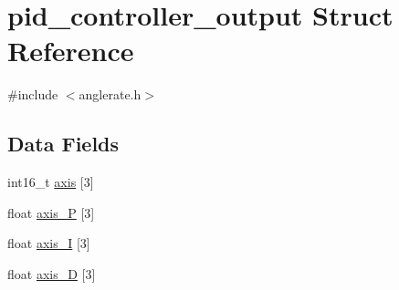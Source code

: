 \hypertarget{structpid__controller__output}{\section{pid\+\_\+controller\+\_\+output Struct Reference}
\label{structpid__controller__output}
}


{\ttfamily \#include $<$anglerate.\+h$>$}

\subsection*{Data Fields}
\begin{DoxyCompactItemize}
\item 
int16\+\_\+t \hyperlink{structpid__controller__output_a88edf80b3efde787747b459dde00e418}{axis} \mbox{[}3\mbox{]}
\item 
float \hyperlink{structpid__controller__output_a18a80534b5688a9ece1e96116b66c631}{axis\+\_\+\+P} \mbox{[}3\mbox{]}
\item 
float \hyperlink{structpid__controller__output_af26171b3d6c8f997470850480f365b3c}{axis\+\_\+\+I} \mbox{[}3\mbox{]}
\item 
float \hyperlink{structpid__controller__output_ae6bf945884869babff5eb66b97bbca57}{axis\+\_\+\+D} \mbox{[}3\mbox{]}
\end{DoxyCompactItemize}



